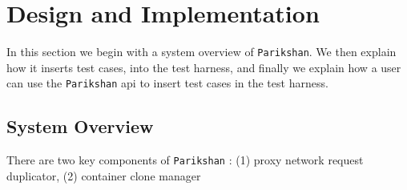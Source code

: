 
\section{Design and Implementation}

In this section we begin with a system overview of \texttt{Parikshan}. 
We then explain how it inserts test cases, into the test harness, and finally we explain how a user can use the \texttt{Parikshan} api to insert test cases in the test harness.

\subsection{System Overview}

There are two key components of \texttt{Parikshan} : (1) proxy network request duplicator, (2) container clone manager

